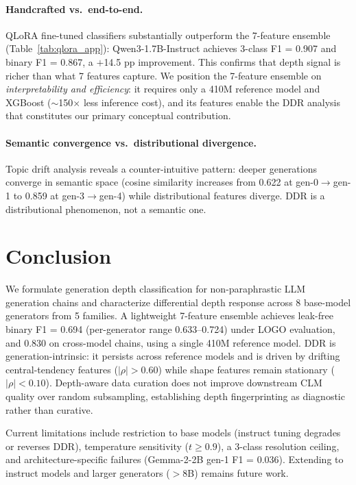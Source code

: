\documentclass[11pt,a4paper]{article}
\begin{document}
\paragraph{Handcrafted vs.\ end-to-end.}
QLoRA fine-tuned classifiers substantially outperform the 7-feature ensemble (Table~\ref{tab:qlora_app}): Qwen3-1.7B-Instruct achieves 3-class F1 = 0.907 and binary F1 = 0.867, a $+$14.5 pp improvement.
This confirms that depth signal is richer than what 7 features capture.
We position the 7-feature ensemble on \emph{interpretability and efficiency}: it requires only a 410M reference model and XGBoost ($\sim$150$\times$ less inference cost), and its features enable the DDR analysis that constitutes our primary conceptual contribution.

\paragraph{Semantic convergence vs.\ distributional divergence.}
Topic drift analysis reveals a counter-intuitive pattern: deeper generations converge in semantic space (cosine similarity increases from 0.622 at gen-0$\to$gen-1 to 0.859 at gen-3$\to$gen-4) while distributional features diverge.
DDR is a distributional phenomenon, not a semantic one.

\section{Conclusion}

We formulate generation depth classification for non-paraphrastic LLM generation chains and characterize differential depth response across 8 base-model generators from 5 families.
A lightweight 7-feature ensemble achieves leak-free binary F1 = 0.694 (per-generator range 0.633--0.724) under LOGO evaluation, and 0.830 on cross-model chains, using a single 410M reference model.
DDR is generation-intrinsic: it persists across reference models and is driven by drifting central-tendency features ($|\rho| > 0.60$) while shape features remain stationary ($|\rho| < 0.10$).
Depth-aware data curation does not improve downstream CLM quality over random subsampling, establishing depth fingerprinting as diagnostic rather than curative.

Current limitations include restriction to base models (instruct tuning degrades or reverses DDR), temperature sensitivity ($t \geq 0.9$), a 3-class resolution ceiling, and architecture-specific failures (Gemma-2-2B gen-1 F1 = 0.036).
Extending to instruct models and larger generators ($>$8B) remains future work.
\end{document}
